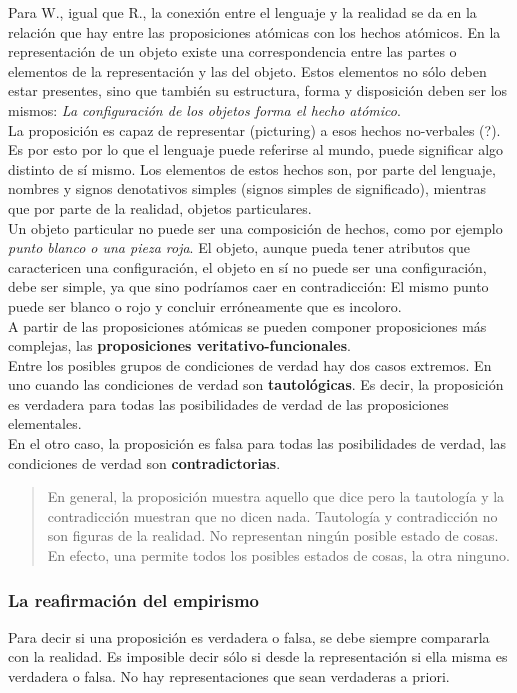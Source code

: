 \documentclass[a4paper, 11pt, twocolumn, spanish]{article}
\begin{document}
Para W., igual que R., la conexión entre el lenguaje y la realidad se
da en la relación que hay entre las proposiciones atómicas con los
hechos atómicos. En la representación de un objeto existe una
correspondencia entre las partes o elementos de la representación y
las del objeto. Estos elementos no sólo deben estar presentes, sino
que también su estructura, forma y disposición deben ser los mismos:
\emph{La configuración de los objetos forma el hecho atómico}.\\

La proposición es capaz de representar (picturing) a esos hechos
no-verbales (?). Es por esto por lo que el lenguaje puede referirse al
mundo, puede significar algo distinto de sí mismo. Los elementos de
estos hechos son, por parte del lenguaje, nombres y signos denotativos
simples (signos simples de significado), mientras que por parte de la
realidad, objetos particulares.\\

Un objeto particular no puede ser una composición de hechos, como por
ejemplo \emph{punto blanco o una pieza roja}. El objeto, aunque pueda tener
atributos que caractericen una configuración, el objeto en sí no puede
ser una configuración, debe ser simple, ya que sino podríamos caer en
contradicción: El mismo punto puede ser blanco o rojo y concluir
erróneamente que es incoloro.\\

A partir de las proposiciones atómicas se pueden componer
proposiciones más complejas, las \textbf{proposiciones
veritativo-funcionales}.\\

Entre los posibles grupos de condiciones de verdad hay dos casos
extremos. En uno cuando las condiciones de verdad son \textbf{tautológicas}. Es
decir, la proposición es verdadera para todas las posibilidades de
verdad de las proposiciones elementales.\\
En el otro caso, la proposición es falsa para todas las posibilidades
de verdad, las condiciones de verdad son \textbf{contradictorias}.
\begin{quote}
En general, la proposición muestra aquello que dice pero la tautología
y la contradicción muestran que no dicen nada. Tautología y
contradicción no son figuras de la realidad. No representan ningún
posible estado de cosas. En efecto, una permite todos los posibles
estados de cosas, la otra ninguno.
\end{quote}

\subsubsection{La reafirmación del empirismo}
\label{sec:org1969ed6}
Para decir si una proposición es verdadera o falsa, se debe siempre
compararla con la realidad. Es imposible decir sólo si desde la
representación si ella misma es verdadera o falsa. No hay
representaciones que sean verdaderas a priori.\\
\end{document}
